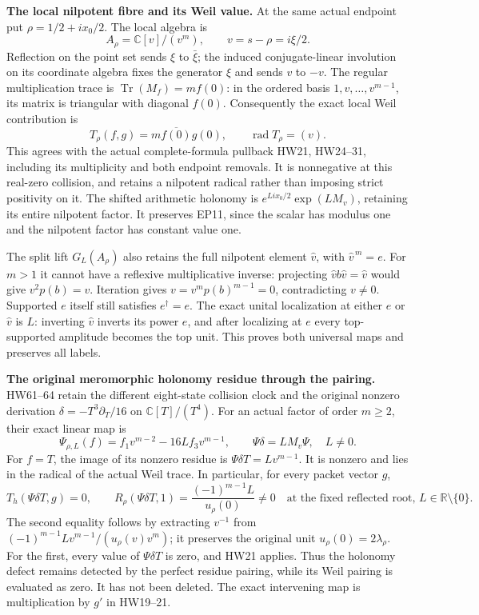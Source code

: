 \EP\textbf{The local nilpotent fibre and its Weil value.}
At the same actual endpoint put $\rho=1/2+ix_0/2$.
The local algebra is
\[
 A_\rho=\mathbb C[v]/(v^m),\qquad v=s-\rho=i\xi/2.
 \tag{EP10}\label{ep:jet}
\]
Reflection on the point set sends $\xi$ to $\bar\xi$; the induced
conjugate-linear involution on its coordinate algebra fixes the
generator $\xi$ and sends $v$ to $-v$.
The regular multiplication trace is
$\operatorname{Tr}(M_f)=m f(0)$: in the ordered basis
$1,v,\ldots,v^{m-1}$, its matrix is triangular with diagonal
$f(0)$. Consequently the exact local Weil contribution is
\[
 T_\rho(f,g)=m\overline{f(0)}g(0),\qquad
 \operatorname{rad}T_\rho=(v).
 \tag{EP11}\label{ep:trace}
\]
This agrees with the actual complete-formula pullback HW21,
HW24--31, including its multiplicity and both endpoint removals.
It is nonnegative at this real-zero collision, and retains a
nilpotent radical rather than imposing strict positivity on it.
The shifted arithmetic holonomy is
$e^{Li x_0/2}\exp(LM_v)$, retaining its entire nilpotent factor.
It preserves EP11, since the scalar has modulus one and the
nilpotent factor has constant value one.

The split lift $G_L(A_\rho)$ also retains the full nilpotent element
$\widehat v$, with $\widehat v^{\,m}=e$. For $m>1$ it cannot have
a reflexive multiplicative inverse: projecting
$\widehat v b\widehat v=\widehat v$ would give $v^2p(b)=v$.
Iteration gives $v=v^m p(b)^{m-1}=0$, contradicting $v\ne0$.
Supported $e$ itself still satisfies $e^\dagger=e$.
The exact unital localization at either $e$ or $\widehat v$
is $L$: inverting $\widehat v$ inverts its power $e$, and after
localizing at $e$ every top-supported amplitude becomes the top
unit. This proves both universal maps and preserves all labels.

\EP\textbf{The original meromorphic holonomy residue through the pairing.}
HW61--64 retain the different eight-state collision clock and the
original nonzero derivation
$\delta=-T^3\partial_T/16$ on $\mathbb C[T]/(T^4)$.
For an actual factor of order $m\ge2$, their exact linear map is
\[
 \Psi_{\rho,L}(f)=f_1v^{m-2}-16Lf_3v^{m-1},\qquad
 \Psi\delta=L M_v\Psi,\quad L\ne0.
 \tag{EP12}
\]
For $f=T$, the image of its nonzero residue is
$\Psi\delta T=Lv^{m-1}$. It is nonzero and lies in the radical
of the actual Weil trace. In particular, for every packet vector $g$,
\[
 T_h(\Psi\delta T,g)=0,
 \qquad
 R_\rho(\Psi\delta T,1)
       =\frac{(-1)^{m-1}L}{u_\rho(0)}\ne0
       \quad\text{at the fixed reflected root, }L\in\mathbb R\setminus\{0\}.
 \tag{EP13}
\]
The second equality follows by extracting $v^{-1}$ from
$(-1)^{m-1}Lv^{m-1}/(u_\rho(v)v^m)$; it preserves the original
unit $u_\rho(0)=2\lambda_\rho$. For the first, every value
of $\Psi\delta T$ is zero, and HW21 applies. Thus the holonomy
defect remains detected by the perfect residue pairing, while its
Weil pairing is evaluated as zero. It has not been deleted.
The exact intervening map is multiplication by $g'$ in HW19--21.

